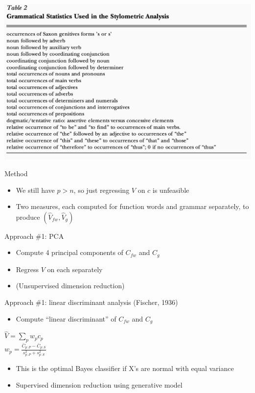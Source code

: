 \documentclass[english]{beamer}
\begin{document}
\begin{frame}{}
\centering
\includegraphics[width=1 \textwidth]{Images/fischer_table2.png}
\end{frame}

\begin{frame}{Method}
\begin{itemize}
\item We still have $p>n$, so just regressing $V$ on $c$ is unfeasible
\item Two measures, each computed for function words and grammar separately, to produce $(\hat{V}_{fw}, \hat{V}_{g})$
\end{itemize}
\end{frame}

\begin{frame}{Approach \#1: PCA}
\begin{itemize}
    \item Compute 4 principal components of $C_{fw}$ and $C_g$
    \item Regress $V$ on each separately
    \item (Unsupervised dimension reduction)
\end{itemize}
\end{frame}

\begin{frame}{Approach \#1: linear discriminant analysis (Fischer, 1936)}
\begin{itemize}
    \item Compute ``linear discriminant'' of $C_{fw}$ and $C_g$ 
    \end{itemize}
    \vspace{15pt}
    \centering
    \large $\hat{V} = \sum_{p}{w_p c_p}$ \\
    \vspace{15pt}
    \centering
    \large $w_{p} = \frac{\bar{C}_{p:P} - \bar{C}_{p:S}}{s_{p:P}^{2} + s_{p:S}^{2}}$
    \vspace{15pt}
\begin{itemize}
\setlength{\itemsep}{0.7em}
\item This is the optimal Bayes classifier if X's are normal with equal variance
\item Supervised dimension reduction using generative model
\end{itemize}
\end{frame}
\end{document}
